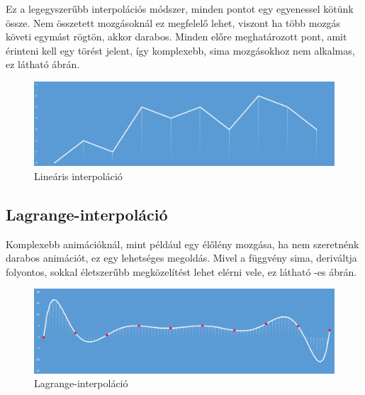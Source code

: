 Ez a legegyszerűbb interpolációs módszer, minden pontot egy egyenessel kötünk össze. Nem összetett mozgásoknál ez megfelelő lehet, viszont ha több mozgás követi egymást rögtön, akkor darabos. Minden előre meghatározott pont, amit érinteni kell egy törést jelent, így komplexebb, sima mozgásokhoz nem alkalmas, ez látható  ábrán.

\begin{figure}[h]
\centering
\includegraphics[scale=0.43]{kepek/linear_interpol.png}
\caption{Lineáris interpoláció}
\label{fig:linear}
\end{figure}

\subsection{Lagrange-interpoláció}

Komplexebb animációknál, mint például egy élőlény mozgása, ha nem szeretnénk darabos animációt, ez egy lehetséges megoldás. Mivel a függvény sima, deriváltja folyontos, sokkal életszerűbb megközelítést lehet elérni vele, ez látható -es ábrán. 

\begin{figure}[h]
\centering
\includegraphics[scale=0.43]{kepek/non_linear_interpol.png}
\caption{Lagrange-interpoláció}
\label{fig:lagrange}
\end{figure}




